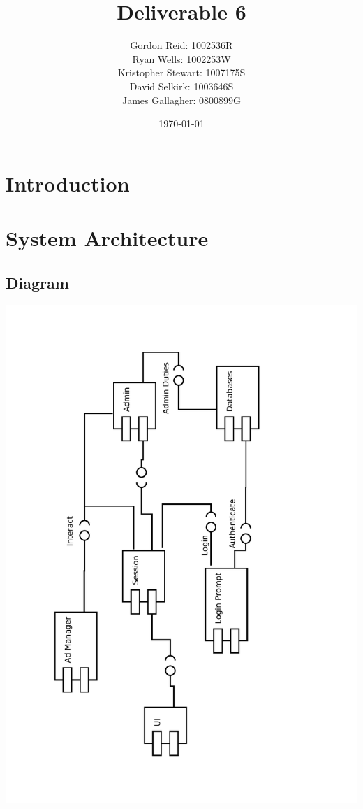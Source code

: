 \documentclass[12pt]{article}
\title{Deliverable 6}
\author{
    Gordon Reid: 1002536R\\
    Ryan Wells: 1002253W\\
    Kristopher Stewart: 1007175S\\
    David Selkirk: 1003646S\\
    James Gallagher: 0800899G\\
}
\date{\today}
\begin{document}
\maketitle

\newpage

\tableofcontents

\newpage

\section{Introduction}

\newpage

\section{System Architecture}

\subsection{Diagram}

\includegraphics[width=\textwidth]{PSDDiagram.pdf}
\end{document}

